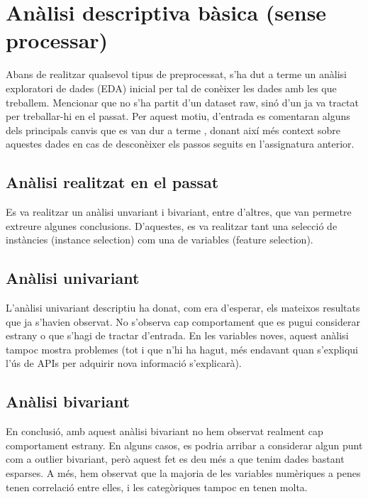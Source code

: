 \section{Anàlisi descriptiva bàsica (sense processar)}

Abans de realitzar qualsevol tipus de preprocessat, s’ha dut a terme un anàlisi exploratori de dades (EDA) inicial per tal de conèixer les dades amb les que treballem. Mencionar que no s’ha partit d’un dataset raw, sinó d’un ja va tractat per treballar-hi en el passat. Per aquest motiu, d’entrada es comentaran alguns dels principals canvis que es van dur a terme , donant així més context sobre aquestes dades en cas de desconèixer els passos seguits en l’assignatura anterior.

\subsection{Anàlisi realitzat en el passat}
Es va realitzar un anàlisi unvariant i bivariant, entre d'altres, que van permetre extreure algunes conclusions. D'aquestes, es va realitzar tant una selecció de instàncies (instance selection) com una de variables (feature selection). 

\subsection{Anàlisi univariant}

L’anàlisi univariant descriptiu ha donat, com era d’esperar, els mateixos resultats que ja s’havien observat. No s’observa cap comportament que es pugui considerar estrany o que s’hagi de tractar d’entrada. En les variables noves, aquest anàlisi tampoc mostra problemes (tot i que n’hi ha hagut, més endavant quan s’expliqui l’ús de APIs per adquirir nova informació s’explicarà).


\subsection{Anàlisi bivariant}


En conclusió, amb aquest anàlisi bivariant no hem observat realment cap comportament estrany. En alguns casos, es podria arribar a considerar algun punt com a outlier bivariant, però aquest fet es deu més a que tenim dades bastant esparses. A més, hem observat que la majoria de les variables numèriques a penes tenen correlació entre elles, i les categòriques tampoc en tenen molta.

